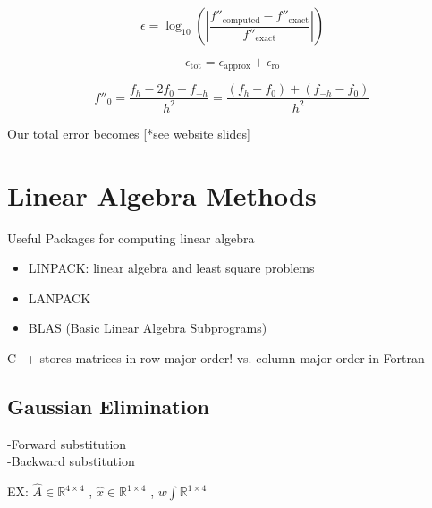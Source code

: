 \documentclass[10pt]{article} %
\begin{document}
\[ \epsilon = \log_{10} \left( \left| \dfrac{f''_{\text{computed}}-f''_{\text{exact}}}{f''_{\text{exact}}} \right| \right) \]

\[ \epsilon_{\text{tot}} = \epsilon_{\text{approx}}+\epsilon_{\text{ro}} \]

\[ f''_0=\dfrac{f_h-2f_0+f_{-h}}{h^2} = \dfrac{(f_h-f_0)+(f_{-h}-f_0)}{h^2} \]

Our total error becomes [*see website slides]

\section{Linear Algebra Methods}

Useful Packages for computing linear algebra

\begin{itemize}
\item LINPACK: linear algebra and least square problems
\item LANPACK
\item BLAS (Basic Linear Algebra Subprograms)
\end{itemize}

C++  stores matrices in row major order! vs. column major order in Fortran

\subsection{Gaussian Elimination}

-Forward substitution \\ -Backward substitution

EX: $ \hat{A} \in \mathbb{R}^{4\times 4} $ , $\hat{x} \in \mathbb{R}^{1\times 4}$ , $w \int \mathbb{R}^{1\times 4}$
\end{document}
